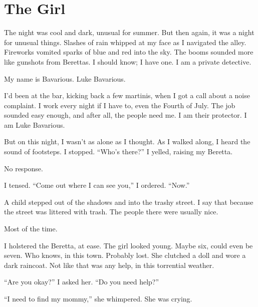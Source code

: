\chapter{The Girl}



The night was cool and dark, unusual for summer. But then again, it
was a night for unusual things. Slashes of rain whipped at my face
as I navigated the alley. Fireworks vomited sparks of blue and red
into the sky. The booms sounded more like gunshots from Berettas. I
should know; I have one. I am a private detective.



My name is Bavarious. Luke Bavarious.



I'd been at the bar, kicking back a few martinis, when I got a call
about a noise complaint. I work every night if I have to, even the
Fourth of July. The job sounded easy enough, and after all, the
people need me. I am their protector. I am Luke Bavarious.



But on this night, I wasn't as alone as I thought. As I walked
along, I heard the sound of footsteps. I stopped. ``Who's there?'' I
yelled, raising my Beretta.



No response.



I tensed. ``Come out where I can see you,'' I ordered. ``Now.''



A child stepped out of the shadows and into the trashy street. I
say that because the street was littered with trash. The people
there were usually nice.



Most of the time.



I holstered the Beretta, at ease. The girl looked young. Maybe six,
could even be seven. Who knows, in this town. Probably lost. She
clutched a doll and wore a dark raincoat. Not like that was any
help, in this torrential weather.



``Are you okay?'' I asked her. ``Do you need help?''



``I need to find my mommy,'' she whimpered. She was crying.



